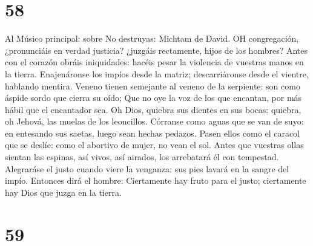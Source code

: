 \hypertarget{section-57}{%
\section{58}\label{section-57}}

 Al Músico principal: sobre No destruyas: Michtam de David.
OH congregación, ¿pronunciáis en verdad justicia? ¿juzgáis rectamente,
hijos de los hombres?  Antes con el corazón obráis
iniquidades: hacéis pesar la violencia de vuestras manos en la tierra.
 Enajenáronse los impíos desde la matriz; descarriáronse
desde el vientre, hablando mentira.  Veneno tienen semejante
al veneno de la serpiente: son como áspide sordo que cierra su oído;
 Que no oye la voz de los que encantan, por más hábil que el
encantador sea.  Oh Dios, quiebra sus dientes en sus bocas:
quiebra, oh Jehová, las muelas de los leoncillos.  Córranse
como aguas que se van de suyo: en entesando sus saetas, luego sean
hechas pedazos.  Pasen ellos como el caracol que se deslíe:
como el abortivo de mujer, no vean el sol.  Antes que
vuestras ollas sientan las espinas, así vivos, así airados, los
arrebatará él con tempestad.  Alegraráse el justo cuando
viere la venganza: sus pies lavará en la sangre del impío. 
Entonces dirá el hombre: Ciertamente hay fruto para el justo;
ciertamente hay Dios que juzga en la tierra.

\hypertarget{section-58}{%
\section{59}\label{section-58}}


